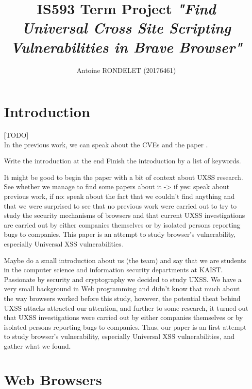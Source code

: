 \documentclass[journal]{IEEEtran}
\begin{document}
\title{IS593 Term Project \emph{"Find Universal Cross Site Scripting Vulnerabilities in Brave Browser"}}

\author{Antoine RONDELET (20176461)}
\maketitle
\IEEEpeerreviewmaketitle

\section{Introduction}
[TODO]\\

In the previous work, we can speak about the CVEs and the paper \cite{uxssJSLeaks}.

Write the introduction at the end
Finish the introduction by a list of keywords.

It might be good to begin the paper with a bit of context about UXSS research. See whether we manage to find some papers about it -> if yes: speak about previous work, if no: speak about the fact that we couldn't find anything and that we were surprised to see that no previous work were carried out to try to study the security mechanisms of browsers and that current UXSS investigations are carried out by either companies themselves or by isolated persons reporting bugs to companies. This paper is an attempt to study browser's vulnerability, especially Universal XSS vulnerabilities.

Maybe do a small introduction about us (the team) and say that we are students in the computer science and information security departments at KAIST. Passionate by security and cryptography we decided to study UXSS. We have a very small background in Web programming and didn't know that much about the way browsers worked before this study, however, the potential theat behind UXSS attacks attracted our attention, and further to some research, it turned out that UXSS investigations were carried out by either companies themselves or by isolated persons reporting bugs to companies. Thus, our paper is an first attempt to study browser's vulnerability, especially Universal XSS vulnerabilities, and gather what we found. 

\section{Web Browsers}
\end{document}
